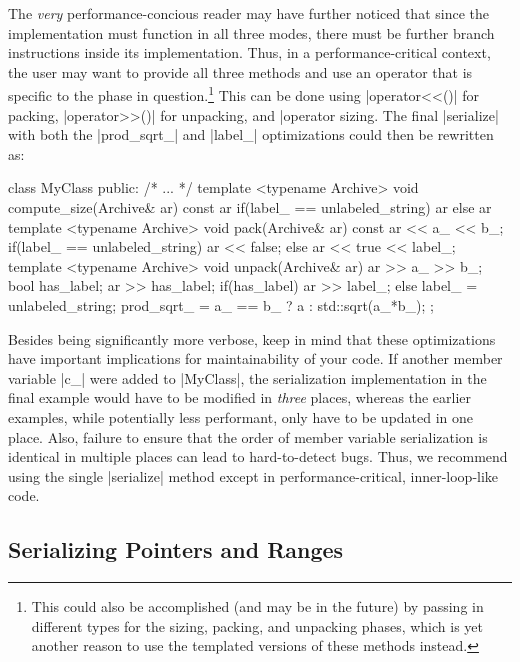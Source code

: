 The {\it very} performance-concious reader may have further noticed that since
the  implementation must function in all three modes,
there must be further branch instructions inside its implementation.  Thus, in a
performance-critical context, the user may want to provide all three methods and
use an operator that is specific to the phase in question.\footnote{This could
also be accomplished (and may be in the future) by passing in different types
for the sizing, packing, and unpacking phases, which is yet another reason to
use the templated versions of these methods instead.}  This can be done using
|operator<<()| for packing, |operator>>()| for unpacking, and |operator%
sizing.  The final |serialize| with both the |prod_sqrt_| and |label_|
optimizations could then be rewritten as:
%
\begin{CppCodeNumb}
class MyClass {
  public:
    /* ... */
    template <typename Archive>
    void compute_size(Archive& ar) const {
      ar %
      if(label_ == unlabeled_string) ar %
      else ar %
    }
    template <typename Archive>
    void pack(Archive& ar) const {
      ar << a_ << b_;
      if(label_ == unlabeled_string) ar << false;
      else ar << true << label_;
    }
    template <typename Archive>
    void unpack(Archive& ar) {
      ar >> a_ >> b_;
      bool has_label;
      ar >> has_label;
      if(has_label) ar >> label_;
      else label_ = unlabeled_string;
      prod_sqrt_ = a_ == b_ ? a : std::sqrt(a_*b_);
    }
};
\end{CppCodeNumb}
%
Besides being significantly more verbose, keep in mind that these optimizations
have important implications for maintainability of your code.  If another member
variable |c_| were added to |MyClass|, the serialization implementation in the
final example would have to be modified in {\it three} places, whereas the
earlier examples, while potentially less performant, only have to be updated in
one place.  Also, failure to ensure that the order of member variable
serialization is identical in multiple places can lead to hard-to-detect bugs. 
Thus, we recommend using the single |serialize| method except in
performance-critical, inner-loop-like code.

\subsection{Serializing Pointers and Ranges}

